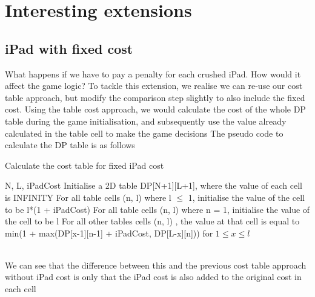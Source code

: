 \documentclass[12pt,a4paper,oneside]{report}
\begin{document}

\chapter{Interesting extensions}
\section{iPad with fixed cost}
What happens if we have to pay a penalty for each crushed iPad. How would it affect the game logic?
To tackle this extension, we realise we can re-use our cost table approach, but modify the comparison step slightly to also include the fixed cost. 
Using the table cost approach, we would calculate the cost of the whole DP table during the game initialisation, and subsequently use the value already calculated in the table cell to make the game decisions
The pseudo code to calculate the DP table is as follows
\begin{algorithm}
        \caption{Calculate the cost table for fixed iPad cost}
        \begin{algorithmic}[1]
            \REQUIRE N, L, iPadCost
            \STATE Initialise a 2D table DP[N+1][L+1], where the value of each cell is INFINITY
            \STATE For all table cells (n, l) where l $\leq$ 1, initialise the value of the cell to be l*(1 + iPadCost)
            \STATE For all table cells (n, l) where n = 1, initialise the value of the cell to be l
            \STATE For all other tables cells (n, l) , the value at that cell is equal to min(1 + max(DP[x-1][n-1] + iPadCost, DP[L-x][n])) for $1 \leq x \leq l$
        \end{algorithmic}
\end{algorithm}
\\We can see that the difference between this and the previous cost table approach without iPad cost is only that the iPad cost is also added to the original cost in each cell
\end{document}
